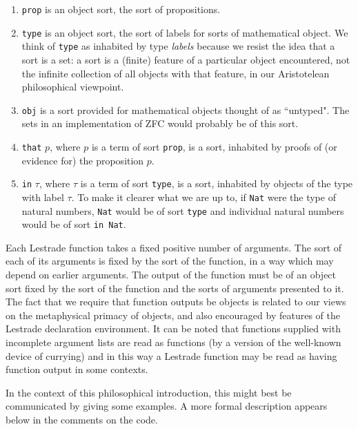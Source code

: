 \documentclass[12pt]{article}
\begin{document}
\begin{enumerate}

\item  {\tt prop} is an object sort, the sort of propositions.

\item {\tt type} is an object sort, the sort of labels for sorts of mathematical object.  We think of {\tt type} as inhabited by type {\em labels\/}  because we resist the idea that a sort is a set:  a sort is a (finite) feature of a particular object encountered, not the infinite collection of all objects with that feature, in our Aristotelean philosophical viewpoint.

\item  {\tt obj} is a sort provided for mathematical objects thought of as ``untyped".  The sets in an implementation of ZFC would probably be of this sort.

\item  {\tt that} $p$, where $p$ is a term of sort {\tt prop}, is a sort, inhabited by proofs of (or evidence for) the proposition $p$.

\item {\tt in} $\tau$, where $\tau$ is a term of sort {\tt type}, is a sort, inhabited by objects of the type with label $\tau$.  To make it clearer what we are up to, if {\tt Nat} were the type of natural numbers, {\tt Nat} would be of sort {\tt type} and individual natural numbers would be of sort {\tt in Nat}.

\end{enumerate}

Each Lestrade function takes a fixed positive number of arguments.  The sort of each of its arguments is fixed by the sort of the function, in a way which may depend
on earlier arguments.  The output of the function must be of an object sort fixed by the sort of the function and the sorts of arguments presented to it.  The fact that we require that function outputs be objects is related to
our views on the metaphysical primacy of objects, and also encouraged by features of the Lestrade declaration environment.  It can be noted that functions supplied with incomplete
argument lists are read as functions (by a version of the well-known device of currying) and in this way a Lestrade function may be read as having function output in some contexts.

In the context of this philosophical introduction, this might best be communicated by giving some examples.  A more formal description appears below in the comments on the code.
\end{document}
